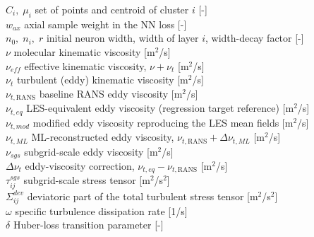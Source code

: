 $C_i,\; \mu_i$       set of points and centroid of cluster $i$ [-] \\
$w_{ax}$             axial sample weight in the NN loss [-] \\
$n_0,\; n_i,\; r$    initial neuron width, width of layer $i$, width-decay factor [-] \\[6pt]
$\nu$                molecular kinematic viscosity [m$^2$/s] \\
$\nu_{eff}$          effective kinematic viscosity, $\nu+\nu_t$ [m$^2$/s] \\
$\nu_t$              turbulent (eddy) kinematic viscosity [m$^2$/s] \\
$\nu_{t,\mathrm{RANS}}$ baseline RANS eddy viscosity [m$^2$/s] \\
$\nu_{t,eq}$         LES-equivalent eddy viscosity (regression target reference) [m$^2$/s] \\
$\nu_{t,mod}$        modified eddy viscosity reproducing the LES mean fields [m$^2$/s] \\
$\nu_{t,ML}$         ML-reconstructed eddy viscosity, $\nu_{t,\mathrm{RANS}}+\Delta\nu_{t,ML}$ [m$^2$/s] \\
$\nu_{sgs}$          subgrid-scale eddy viscosity [m$^2$/s] \\
$\Delta\nu_t$        eddy-viscosity correction, $\nu_{t,eq}-\nu_{t,\mathrm{RANS}}$ [m$^2$/s] \\
$\tau_{ij}^{sgs}$    subgrid-scale stress tensor [m$^2$/s$^2$] \\
$\Sigma_{ij}^{dev}$  deviatoric part of the total turbulent stress tensor [m$^2$/s$^2$] \\
$\omega$             specific turbulence dissipation rate [1/s] \\
$\delta$             Huber-loss transition parameter [-] \\[6pt]


